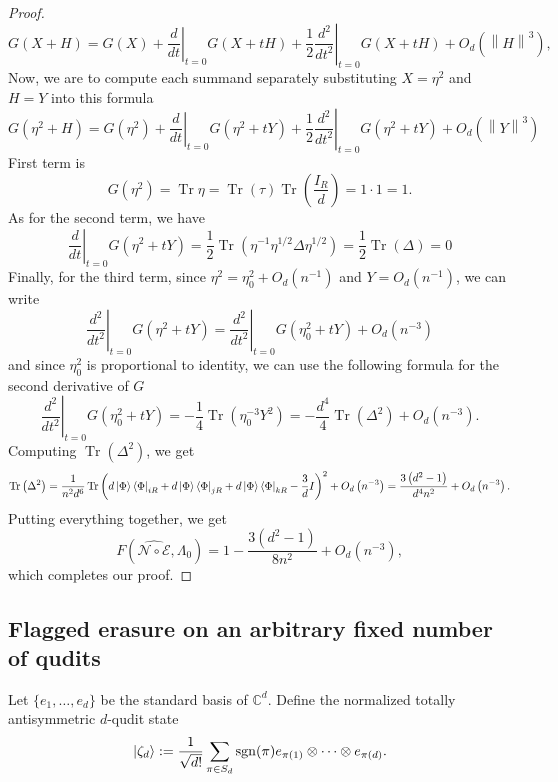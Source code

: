 \documentclass[11pt,letterpaper]{article}
\theoremstyle{plain}
\theoremstyle{plain}
\theoremstyle{plain}
\theoremstyle{plain}
\theoremstyle{plain}
\theoremstyle{plain}
\newcommand{\C}{\mathbb{C}}
\theoremstyle{plain}
\theoremstyle{definition}
\theoremstyle{plain}
\begin{document}
\begin{proof}
\[        G\left(X+H\right)=G\left(X\right)+\left.\frac{d}{d t}\right|_{t=0} G(X+t H)+\frac{1}{2} \left.\frac{d^2}{d t^2}\right|_{t=0} G\left(X+t H\right)+O_{d}\left(\left\|H\right\|^3\right),
    \]
    Now, we are to compute each summand separately substituting $X=\eta^2$ and $H=Y$ into this formula
    \[
        G\left(\eta^2+H\right)=G\left(\eta^2\right)+\left.\frac{d}{d t}\right|_{t=0} G(\eta^2+t Y)+\frac{1}{2} \left.\frac{d^2}{d t^2}\right|_{t=0} G\left(\eta^2+t Y\right)+O_{d}\left(\left\|Y\right\|^3\right)
    \]
    First term is
    \[
        G\left(\eta^2\right) = \operatorname{Tr} \eta= \operatorname{Tr}\left(\tau\right) \operatorname{Tr}\left(\frac{I_R}{d}\right)=1 \cdot 1=1.
    \]
    As for the second term, we have
    \[
        \left.\frac{d}{d t}\right|_{t=0} G(\eta^2+t Y)=\frac{1}{2} \operatorname{Tr}\left(\eta^{-1} \eta^{1 / 2} \Delta \eta^{1 / 2}\right)=\frac{1}{2} \operatorname{Tr}\left(\Delta\right)=0
    \]
    Finally, for the third term, since $\eta^2=\eta_0^2+O_{d}\left(n^{-1}\right)$ and $Y=O_{d}\left(n^{-1}\right)$, we can write
    \[
        \left.\frac{d^2}{d t^2}\right|_{t=0} G\left(\eta^2+t Y\right)=\left.\frac{d^2}{d t^2}\right|_{t=0} G\left(\eta_0^2+t Y\right)+O_{d}\left(n^{-3}\right)
    \]
    and since $\eta_0^2$ is proportional to identity, we can use the following formula for the second derivative of $G$ 
    \[
        \left.\frac{d^2}{d t^2}\right|_{t=0} G\left(\eta_0^2+t Y\right)=-\frac{1}{4}  \operatorname{Tr}\left(\eta_0^{-3} Y^2\right)=-\frac{d^4}{4} \operatorname{Tr}\left(\Delta^2\right)+O_{d}\left(n^{-3}\right).
    \]
    Computing $\operatorname{Tr}(\Delta^2)$, we get
    \[
        \operatorname{Tr}\left(\Delta^2\right)=\frac{1}{n^2 d^6} \operatorname{Tr}\left(d\ket{\Phi}\bra{\Phi}_{i R}+d\ket{\Phi}\bra{\Phi}_{j R}+d\ket{\Phi}\bra{\Phi}_{k R}-\frac{3}{d} I\right)^2+O_{d}\left(n^{-3}\right)=\frac{3\left(d^2-1\right)}{d^4n^2}+O_{d}\left(n^{-3}\right).
    \]
    Putting everything together, we get
    \[
                F(\widehat{\mathcal{N} \circ \mathcal{E}}, \Lambda_0)=1-\frac{3\left(d^2-1\right)}{8n^2}+O_{d}\left(n^{-3}\right),
    \]
    which completes our proof.
\end{proof}

\subsection{Flagged erasure on an arbitrary fixed number of qudits}\label{subsec:supple_multiqudit_erasure}

Let $\{e_1,\ldots,e_d\}$ be the standard basis of $\C^d$. Define the normalized totally antisymmetric $d$-qudit state
\begin{equation}
\label{eq:singlet}
  \ket{\zeta_d}
  :=\frac1{\sqrt{d!}}
  \sum_{\pi\in S_d}\operatorname{sgn}(\pi)
  e_{\pi(1)}\otimes\cdots\otimes e_{\pi(d)}.
\end{equation}
\end{document}
